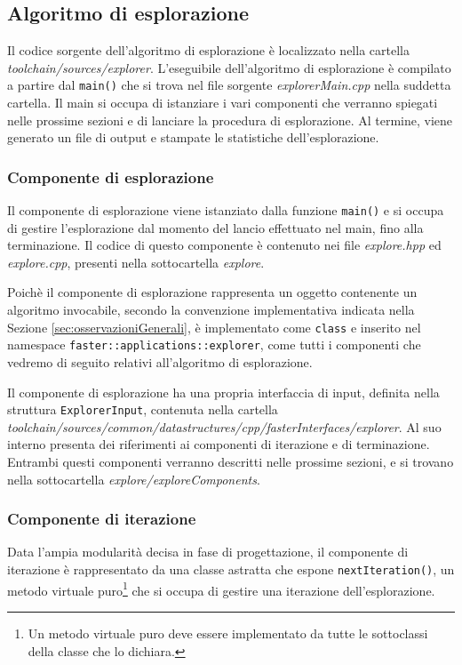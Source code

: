\subsection{Algoritmo di esplorazione}
\label{subsec:algoritmoEsplorazione}
Il codice sorgente dell'algoritmo di esplorazione è localizzato nella cartella 
\emph{toolchain/sources/explorer}. L'eseguibile dell'algoritmo di esplorazione 
è compilato a partire dal \verb+main()+ che si trova nel file sorgente 
\emph{explorerMain.cpp} nella suddetta cartella. Il main si occupa di 
istanziare i vari componenti che verranno spiegati nelle prossime sezioni e di 
lanciare la procedura di esplorazione. Al termine, viene generato un file di 
output e stampate le statistiche dell'esplorazione.

\subsubsection{Componente di esplorazione}
Il componente di esplorazione viene istanziato dalla funzione \verb+main()+ e 
si occupa di gestire l'esplorazione dal momento del lancio effettuato nel main, 
fino alla terminazione. Il codice di questo componente è contenuto nei file 
\emph{explore.hpp} ed \emph{explore.cpp}, presenti nella sottocartella 
\emph{explore}.

Poichè il componente di esplorazione rappresenta un oggetto contenente un 
algoritmo invocabile, secondo la convenzione implementativa indicata nella 
Sezione \ref{sec:osservazioniGenerali}, è implementato come \verb+class+ e 
inserito nel namespace \verb+faster::applications::explorer+, come tutti i 
componenti che vedremo di seguito relativi all'algoritmo di esplorazione.

Il componente di esplorazione ha una propria interfaccia di input, definita 
nella struttura \verb+ExplorerInput+, contenuta nella cartella 
\emph{toolchain/sources/common/datastructures/cpp/fasterInterfaces/explorer}. 
Al suo interno presenta dei riferimenti ai componenti di iterazione e di 
terminazione. Entrambi questi componenti verranno descritti nelle prossime 
sezioni, e si trovano nella sottocartella \emph{explore/exploreComponents}.

\subsubsection{Componente di iterazione}
Data l'ampia modularità decisa in fase di progettazione, il componente di 
iterazione è rappresentato da una classe astratta che espone 
\verb+nextIteration()+, un metodo virtuale puro\footnote{Un metodo virtuale 
puro deve essere implementato da tutte le sottoclassi della classe che lo 
dichiara.} che si occupa di gestire una iterazione dell'esplorazione.

